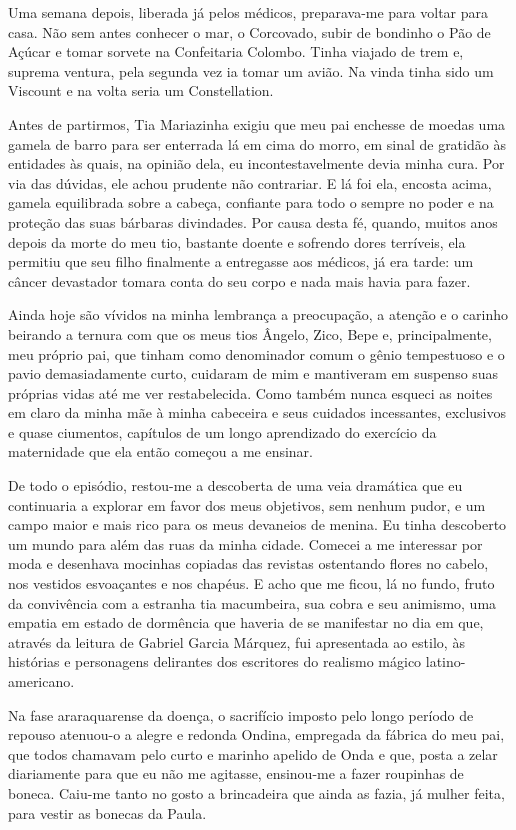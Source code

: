 Uma semana depois, liberada já pelos médicos, preparava\hyp{}me para voltar para casa. Não sem antes conhecer o mar, o Corcovado, subir de bondinho o Pão de Açúcar e tomar sorvete na Confeitaria Colombo. 
Tinha viajado de trem e, suprema ventura, pela segunda vez ia tomar um avião. 
Na vinda tinha sido um Viscount e na volta seria um Constellation. 

Antes de partirmos, Tia Mariazinha exigiu que meu pai enchesse de moedas uma gamela de barro para ser enterrada lá em cima do morro, em sinal de gratidão às entidades às quais, na opinião dela, eu incontestavelmente devia minha cura. 
Por via das dúvidas, ele achou prudente não contrariar. 
E lá foi ela, encosta acima, gamela equilibrada sobre a cabeça, confiante para todo o sempre no poder e na proteção das suas bárbaras divindades. 
Por causa desta fé, quando, muitos anos depois da morte do meu tio, bastante doente e sofrendo dores terríveis, ela permitiu que seu filho finalmente a entregasse aos médicos, já era tarde: um câncer devastador tomara conta do seu corpo e nada mais havia para fazer. 

Ainda hoje são vívidos na minha lembrança a preocupação, a atenção e o carinho beirando a ternura com que os meus tios Ângelo, Zico, Bepe e, principalmente, meu próprio pai, que tinham como denominador comum o gênio tempestuoso e o pavio demasiadamente curto, cuidaram de mim e mantiveram em suspenso suas próprias vidas até me ver restabelecida. 
Como também nunca esqueci as noites em claro da minha mãe à minha cabeceira e seus cuidados incessantes, exclusivos e quase ciumentos, capítulos de um longo aprendizado do exercício da maternidade que ela então começou a me ensinar.

De todo o episódio, restou-me a descoberta de uma veia dramática que eu continuaria a explorar em favor dos meus objetivos, sem nenhum pudor, e um campo maior e mais rico para os meus devaneios de menina.
Eu tinha descoberto um mundo para além das ruas da minha cidade. 
Comecei a me interessar por moda e desenhava mocinhas copiadas das revistas ostentando flores no cabelo, nos vestidos esvoaçantes e nos chapéus.  
E acho que me ficou, lá no fundo, fruto da convivência com a estranha tia macumbeira, sua cobra e seu animismo, uma empatia em estado de dormência que haveria de se manifestar no dia em que, através da leitura de Gabriel Garcia Márquez, fui apresentada ao estilo, às histórias e personagens delirantes dos escritores do realismo mágico latino-americano.

Na fase araraquarense da doença, o sacrifício imposto pelo longo período de repouso atenuou-o a alegre e redonda Ondina, empregada da fábrica do meu pai, que todos chamavam pelo curto e marinho apelido de Onda e que, posta a zelar diariamente para que eu não me agitasse, ensinou-me a fazer roupinhas de boneca. 
Caiu-me tanto no gosto a brincadeira que ainda as fazia, já mulher feita, para vestir as bonecas da Paula.

